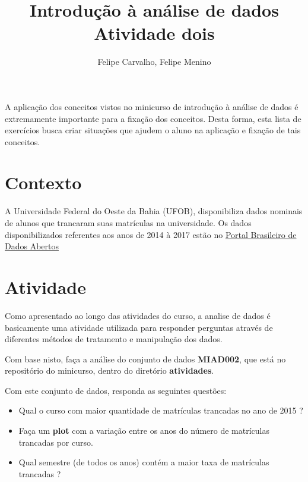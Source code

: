 \documentclass[12pt]{article}
\title{Introdução à análise de dados\\ Atividade dois}
\author{Felipe Carvalho\inst{1}, Felipe Menino\inst{1}}
\begin{document}
 

\maketitle
     
\begin{resumo} 
    A aplicação dos conceitos vistos no minicurso de introdução à análise de dados é extremamente importante para a fixação dos conceitos. Desta forma, esta lista de exercícios busca criar situações que ajudem o aluno na aplicação e fixação de tais conceitos.
\end{resumo}

\section{Contexto}

A Universidade Federal do Oeste da Bahia (UFOB), disponibiliza dados nominais de alunos que trancaram suas matrículas na universidade. Os dados disponibilizados referentes aos anos de 2014 à 2017 estão no \href{http://dados.gov.br/dataset/estudantes-com-matricula-trancada}{Portal Brasileiro de Dados Abertos}

\section{Atividade}

Como apresentado ao longo das atividades do curso, a analise de dados é basicamente uma atividade utilizada para responder perguntas através de diferentes métodos de tratamento e manipulação dos dados.

Com base nisto, faça a análise do conjunto de dados \textbf{MIAD002}, que está no repositório do minicurso, dentro do diretório \textbf{atividades}.

Com este conjunto de dados, responda as seguintes questões:

\begin{itemize}
    \item Qual o curso com maior quantidade de matrículas trancadas no ano de 2015 ?
    \item Faça um \textbf{plot} com a variação entre os anos do número de matrículas trancadas por curso.
    \item Qual semestre (de todos os anos) contém a maior taxa de matrículas trancadas ?
\end{itemize}
\end{document}
